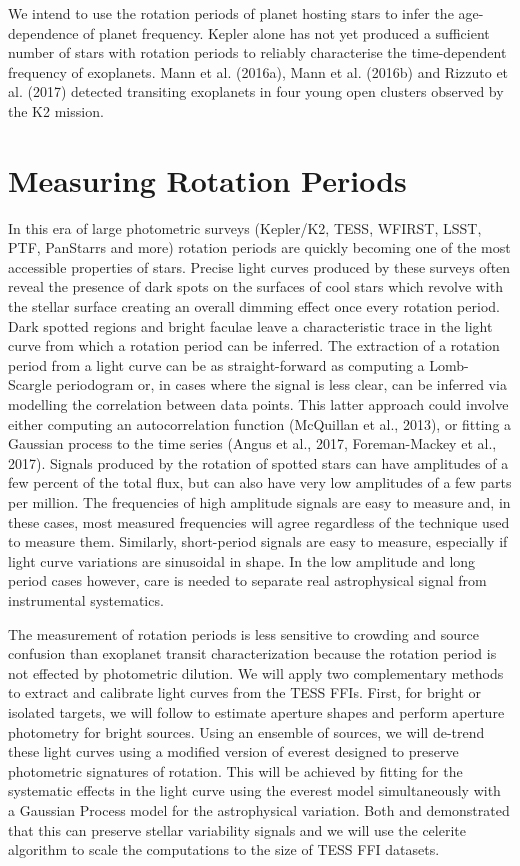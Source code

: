 \documentclass[useAMS, usenatbib, preprint, 12pt]{aastex}
\begin{document}
We intend to use the rotation periods of planet hosting stars to infer the
age-dependence of planet frequency.
Kepler alone has not yet produced a sufficient number of stars with rotation
periods to reliably characterise the time-dependent frequency of exoplanets.
Mann et al. (2016a), Mann et al. (2016b) and Rizzuto et al. (2017) detected
transiting exoplanets in four young open clusters observed by the K2 mission.

\section{Measuring Rotation Periods}
In this era of large photometric surveys (Kepler/K2, TESS, WFIRST, LSST, PTF,
PanStarrs and more) rotation periods are quickly becoming one of the most
accessible properties of stars.
Precise light curves produced by these surveys often reveal the presence of
dark spots on the surfaces of cool stars which revolve with the stellar
surface creating an overall dimming effect once every rotation period.
Dark spotted regions and bright faculae leave a characteristic trace in the
light curve from which a rotation period can be inferred.
The extraction of a rotation period from a light curve can be as
straight-forward as computing a Lomb-Scargle periodogram or, in cases where
the signal is less clear, can be inferred via modelling the correlation
between data points.
This latter approach could involve either computing an autocorrelation
function (McQuillan et al., 2013), or fitting a Gaussian process to the time
series (Angus et al., 2017, Foreman-Mackey et al., 2017).
Signals produced by the rotation of spotted stars can have amplitudes of a few
percent of the total flux, but can also have very low amplitudes of a few
parts per million.
The frequencies of high amplitude signals are easy to measure and, in these
cases, most measured frequencies will agree regardless of the technique used
to measure them.
Similarly, short-period signals are easy to measure, especially if light curve
variations are sinusoidal in shape.
In the low amplitude and long period cases however, care is needed to separate
real astrophysical signal from instrumental systematics.

The measurement of rotation periods is less sensitive to crowding and source
confusion than exoplanet transit characterization because the rotation period
is not effected by photometric dilution.
We will apply two complementary methods to extract and calibrate light curves
from the TESS FFIs.
First, for bright or isolated targets, we will follow \citet{montet2017} to
estimate aperture shapes and perform aperture photometry for bright sources.
Using an ensemble of sources, we will de-trend these light curves using a
modified version of \textsf{everest} \citep{luger2016, luger2017} designed to
preserve photometric signatures of rotation.
This will be achieved by fitting for the systematic effects in the light curve
using the \textsf{everest} model simultaneously with a Gaussian Process model
for the astrophysical variation.
Both \citet{aigrain2016} and \citet{luger2016} demonstrated that this can
preserve stellar variability signals and we will use the \textsf{celerite}
algorithm \citep{dfm2017} to scale the computations to the size of TESS FFI
datasets.
\end{document}
